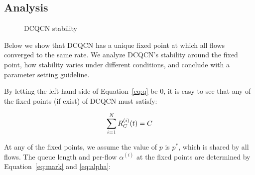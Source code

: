 \subsection{Analysis}

\begin{figure}[t]
\caption{DCQCN stability}
\label{fig:dcqcn_stability}
\end{figure}

Below we show that DCQCN has a unique fixed point at which all flows converged to the 
same rate. We analyze DCQCN's stability around the 
fixed point, how stability varies under different conditions, and conclude with a 
parameter setting guideline.


 By letting the left-hand side of Equation~\ref{eq:q}
be 0, it is easy to see that any of the fixed points (if exist) of DCQCN must satisfy:

\begin{equation}
\small
\sum\limits_{i = 1}^N {R_C^{(i)}(t)} = C
\label{eq:fixedrc}
\end{equation}

At any of the fixed points, we assume the value of $p$ is $p^*$, which is shared by all
flows. The queue length and per-flow
$\alpha^{(i)}$ at the fixed points are determined by Equation~\ref{eq:mark} and \ref{eq:alpha}:

